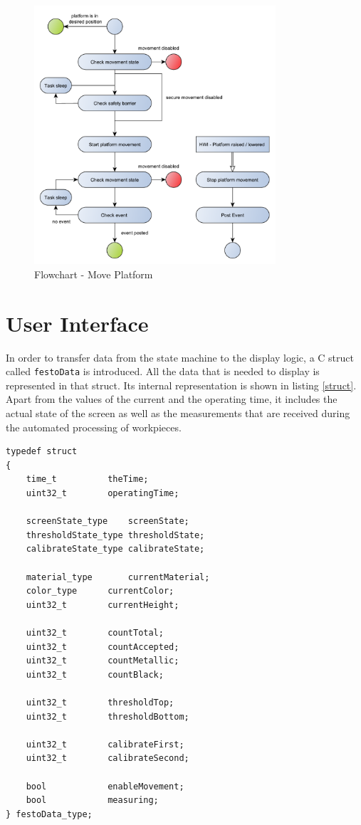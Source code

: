 \begin{figure}[H]
	\begin{center}
		\includegraphics[width=0.8\textwidth]{media/Flow_Chart_MovePlatform.pdf} 	
		\caption{Flowchart - Move Platform}
		\label{fig:moveplatform}
	\end{center}
\end{figure}



\section{User Interface} \label{sec:ui}%

In order to transfer data from the state machine to the display logic, a C struct called \texttt{festoData} is introduced. All the data that is needed to display is represented in that struct. Its internal representation is shown in listing \ref{struct}. Apart from the values of the current and the operating time, it includes the actual state of the screen as well as the measurements that are received during the automated processing of workpieces.

\begin{lstlisting}[label=struct, caption=festoData struct, style=customc]
typedef struct
{
	time_t 			theTime;
	uint32_t 		operatingTime;
	
	screenState_type 	screenState;
	thresholdState_type	thresholdState;
	calibrateState_type	calibrateState;
	
	material_type 		currentMaterial;
	color_type 		currentColor;
	uint32_t 		currentHeight;
	
	uint32_t		countTotal;
	uint32_t 		countAccepted;
	uint32_t 		countMetallic;
	uint32_t 		countBlack;
	
	uint32_t 		thresholdTop;
	uint32_t 		thresholdBottom;
	
	uint32_t 		calibrateFirst;
	uint32_t 		calibrateSecond;
	
	bool 			enableMovement;
	bool 			measuring;
} festoData_type;
\end{lstlisting}

